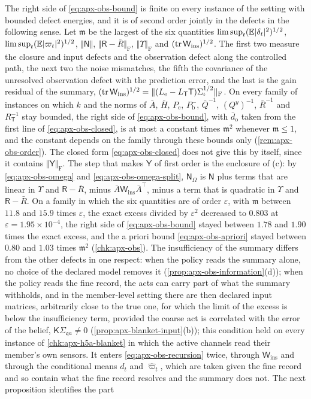 The right side of \eqref{eq:apx-obs-bound} is finite on every instance of the setting with bounded defect energies, and it is of second order jointly in the defects in the following sense. Let $\mathfrak m$ be the largest of the six quantities $\limsup_t(\mathbb{E}\lvert\delta_t\rvert^2)^{1/2}$, $\limsup_t(\mathbb{E}\lvert\varpi_t\rvert^2)^{1/2}$, $\Vert\mathsf N\Vert$, $\Vert\mathsf R-\bar R\Vert_{\mathrm F}$, $\Vert\Upsilon\Vert_{\mathrm F}$ and $(\operatorname{tr}\mathsf W_{\mathrm{ins}})^{1/2}$. The first two measure the closure and input defects and the observation defect along the controlled path, the next two the noise mismatches, the fifth the covariance of the unresolved observation defect with the prediction error, and the last is the gain residual of the summary, $(\operatorname{tr}\mathsf W_{\mathrm{ins}})^{1/2}=\Vert(L_{\mathrm e}-L_{\mathsf T}\mathsf T)\Sigma_\iota^{1/2}\Vert_{\mathrm F}$. On every family of instances on which $k$ and the norms of $\bar A$, $\bar H$, $P_{\mathrm e}$, $P^-_{\mathrm b}$, $\bar Q^{-1}$, $(Q^y)^{-1}$, $\bar R^{-1}$ and $R_{\mathsf T}^{-1}$ stay bounded, the right side of \eqref{eq:apx-obs-bound}, with $\bar d_{\mathrm o}$ taken from the first line of \eqref{eq:apx-obs-closed}, is at most a constant times $\mathfrak m^2$ whenever $\mathfrak m\le1$, and the constant depends on the family through these bounds only (\cref{rem:apx-obs-order}). The closed form \eqref{eq:apx-obs-closed} does not give this by itself, since it contains $\Vert\mathsf Y\Vert_{\mathrm F}$. The step that makes $\mathsf Y$ of first order is the enclosure of (c): by \eqref{eq:apx-obs-omega} and \eqref{eq:apx-obs-omega-split}, $\mathsf N_\Omega$ is $\mathsf N$ plus terms that are linear in $\Upsilon$ and $\mathsf R-\bar R$, minus $\bar A\mathsf W_{\mathrm{ins}}\bar A^\top$, minus a term that is quadratic in $\Upsilon$ and $\mathsf R-\bar R$. On a family in which the six quantities are of order $\varepsilon$, with $\mathfrak m$ between $11.8$ and $15.9$ times $\varepsilon$, the exact excess divided by $\varepsilon^2$ decreased to $0.803$ at $\varepsilon=1.95\times10^{-4}$, the right side of \eqref{eq:apx-obs-bound} stayed between $1.78$ and $1.90$ times the exact excess, and the a priori bound \eqref{eq:apx-obs-apriori} stayed between $0.80$ and $1.03$ times $\mathfrak m^2$ (\cref{chk:apx-obs}). The insufficiency of the summary differs from the other defects in one respect: when the policy reads the summary alone, no choice of the declared model removes it (\cref{prop:apx-obs-information}(d)); when the policy reads the fine record, the acts can carry part of what the summary withholds, and in the member-level setting there are then declared input matrices, arbitrarily close to the true one, for which the limit of the excess is below the insufficiency term, provided the coarse act is correlated with the error of the belief, $\mathsf K\Sigma_{\mathfrak qa}\ne0$ (\cref{prop:apx-blanket-input}(b)); this condition held on every instance of \cref{chk:apx-h5a-blanket} in which the active channels read their member's own sensors. It enters \eqref{eq:apx-obs-recursion} twice, through $\mathsf W_{\mathrm{ins}}$ and through the conditional means $d_t$ and $\hat\varpi_t$, which are taken given the fine record and so contain what the fine record resolves and the summary does not. The next proposition identifies the part 